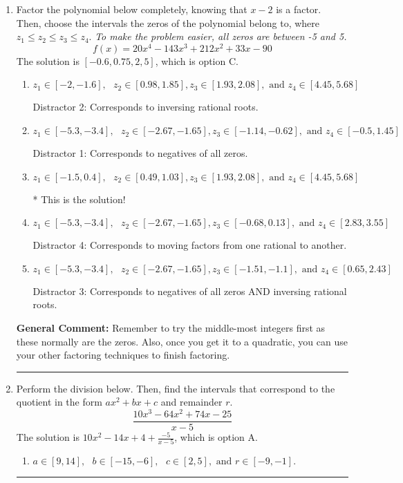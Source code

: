 \documentclass{extbook}[14pt]
\newcommand{\litem}[1]{\item #1

\rule{\textwidth}{0.4pt}}
\begin{document}
\begin{enumerate}\litem{
Factor the polynomial below completely, knowing that $x -2$ is a factor. Then, choose the intervals the zeros of the polynomial belong to, where $z_1 \leq z_2 \leq z_3 \leq z_4$. \textit{To make the problem easier, all zeros are between -5 and 5.}
\[ f(x) = 20x^{4} -143 x^{3} +212 x^{2} +33 x -90 \]The solution is \( [-0.6, 0.75, 2, 5] \), which is option C.\begin{enumerate}[label=\Alph*.]
\item \( z_1 \in [-2, -1.6], \text{   }  z_2 \in [0.98, 1.85], z_3 \in [1.93, 2.08], \text{   and   } z_4 \in [4.45, 5.68] \)

 Distractor 2: Corresponds to inversing rational roots.
\item \( z_1 \in [-5.3, -3.4], \text{   }  z_2 \in [-2.67, -1.65], z_3 \in [-1.14, -0.62], \text{   and   } z_4 \in [-0.5, 1.45] \)

 Distractor 1: Corresponds to negatives of all zeros.
\item \( z_1 \in [-1.5, 0.4], \text{   }  z_2 \in [0.49, 1.03], z_3 \in [1.93, 2.08], \text{   and   } z_4 \in [4.45, 5.68] \)

* This is the solution!
\item \( z_1 \in [-5.3, -3.4], \text{   }  z_2 \in [-2.67, -1.65], z_3 \in [-0.68, 0.13], \text{   and   } z_4 \in [2.83, 3.55] \)

 Distractor 4: Corresponds to moving factors from one rational to another.
\item \( z_1 \in [-5.3, -3.4], \text{   }  z_2 \in [-2.67, -1.65], z_3 \in [-1.51, -1.1], \text{   and   } z_4 \in [0.65, 2.43] \)

 Distractor 3: Corresponds to negatives of all zeros AND inversing rational roots.
\end{enumerate}

\textbf{General Comment:} Remember to try the middle-most integers first as these normally are the zeros. Also, once you get it to a quadratic, you can use your other factoring techniques to finish factoring.
}
\litem{
Perform the division below. Then, find the intervals that correspond to the quotient in the form $ax^2+bx+c$ and remainder $r$.
\[ \frac{10x^{3} -64 x^{2} +74 x -25}{x -5} \]The solution is \( 10x^{2} -14 x + 4 + \frac{-5}{x -5} \), which is option A.\begin{enumerate}[label=\Alph*.]
\item \( a \in [9, 14], \text{   } b \in [-15, -6], \text{   } c \in [2, 5], \text{   and   } r \in [-9, -1]. \)


\end{enumerate}}
\end{enumerate}
\end{document}
